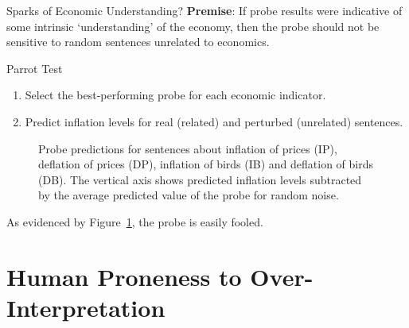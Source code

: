 \documentclass[
  10pt,
  ignorenonframetext,
  aspectratio=169,
  notheorems]{beamer}
\providecommand{\tightlist}{%
  \setlength{\itemsep}{0pt}\setlength{\parskip}{0pt}}\usepackage{longtable,booktabs,array}
\begin{document}
\begin{frame}{Sparks of Economic Understanding?}
\label{sparks-of-economic-understanding}
\textbf{Premise}: If probe results were indicative of some intrinsic
`understanding' of the economy, then the probe should not be sensitive
to random sentences unrelated to economics.

\begin{block}{Parrot Test}
\label{parrot-test}
\begin{enumerate}
\tightlist
\item
  Select the best-performing probe for each economic indicator.
\item
  Predict inflation levels for real (related) and perturbed (unrelated)
  sentences.
\end{enumerate}

\begin{figure}


\caption{\label{fig-attack}Probe predictions for sentences about
inflation of prices (IP), deflation of prices (DP), inflation of birds
(IB) and deflation of birds (DB). The vertical axis shows predicted
inflation levels subtracted by the average predicted value of the probe
for random noise.}

\end{figure}%

As evidenced by Figure~\ref{fig-attack}, the probe is easily fooled.
\end{block}
\end{frame}

\section{Human Proneness to
Over-Interpretation}\label{human-proneness-to-over-interpretation}
\end{document}
